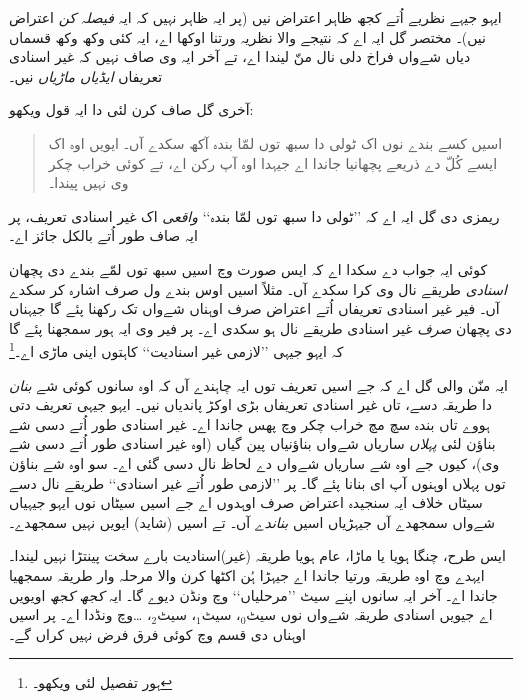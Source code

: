 \documentclass[../../../include/open-logic-section]{subfiles}
\begin{document}
ایہو جیہے نظریے اُتے کجھ ظاہر اعتراض نیں (پر ایہ ظاہر نہیں کہ ایہ
\emph{فیصلہ کن} اعتراض نیں)۔ مختصر گل ایہ اے کہ نتیجے والا نظریہ ورتنا
اوکھا اے، ایہ کئی وکھ وکھ قسماں دیاں شےواں فراخ دلی نال منّ لیندا اے،
تے آخر ایہ وی صاف نہیں کہ غیر اسنادی تعریفاں \emph{ایڈیاں ماڑیاں} نیں۔

آخری گل صاف کرن لئی \citeauthor{Ramsey1925} دا ایہ قول ویکھو:
\begin{quote}
	اسیں کسے بندے نوں اک ٹولی دا سبھ توں لمّا بندہ آکھ سکدے آں۔ ایویں
	اوہ اک ایسے کُلّ دے ذریعے پچھانیا جاندا اے جیہدا اوہ آپ رکن اے،
	تے کوئی خراب چکر وی نہیں پیندا۔ \citep{Ramsey1925}
\end{quote}
ریمزی دی گل ایہ اے کہ ’’ٹولی دا سبھ توں لمّا بندہ‘‘ \emph{واقعی} اک غیر اسنادی
تعریف، پر ایہ صاف طور اُتے بالکل جائز اے۔

کوئی ایہ جواب دے سکدا اے کہ ایس صورت وچ اسیں سبھ توں لمّے بندے دی پچھان
\emph{اسنادی} طریقے نال وی کرا سکدے آں۔ مثلاً اسیں اوس بندے ول صرف اشارہ
کر سکدے آں۔ فیر غیر اسنادی تعریفاں اُتے اعتراض صرف اوہناں شےواں تک
رکھنا پئے گا جیہناں دی پچھان \emph{صرف} غیر اسنادی طریقے نال ہو سکدی اے۔
پر فیر وی ایہ ہور سمجھنا پئے گا کہ ایہو جیہی ’’لازمی غیر اسنادیت‘‘
کاہتوں اینی ماڑی اے۔\footnote{ہور تفصیل لئی \citet{Linnebo2010} ویکھو۔}

ایہ منّن والی گل اے کہ جے اسیں تعریف توں ایہ چاہندے آں کہ اوہ سانوں
کوئی شے \emph{بنان} دا طریقہ دسے، تاں غیر اسنادی تعریفاں بڑی اوکڑ پاندیاں
نیں۔ ایہو جیہی تعریف دتی ہووے تاں بندہ سچ مچ خراب چکر وچ پھس جاندا اے۔
غیر اسنادی طور اُتے دسی شے بناؤن لئی \emph{پہلاں} ساریاں شےواں بناؤنیاں
پین گیاں (اوہ غیر اسنادی طور اُتے دسی شے وی)، کیوں جے اوہ شے ساریاں شےواں
دے لحاظ نال دسی گئی اے۔ سو اوہ شے بناؤن توں پہلاں اوہنوں آپ ای بنانا پئے گا۔
پر ’’لازمی طور اُتے غیر اسنادی‘‘ طریقے نال دسے سیٹاں خلاف ایہ سنجیدہ اعتراض
صرف اوہدوں اے جے اسیں سیٹاں نوں ایہو جیہیاں شےواں سمجھدے آں جیہڑیاں
اسیں \emph{بناندے} آں۔ تے اسیں (شاید) ایویں نہیں سمجھدے۔

ایس طرح، چنگا ہویا یا ماڑا، عام ہویا طریقہ (غیر)اسنادیت بارے سخت پینتڑا
نہیں لیندا۔ ایہدے وچ اوہ طریقہ ورتیا جاندا اے جیہڑا ہُن اکٹھا کرن والا
مرحلہ وار طریقہ سمجھیا جاندا اے۔ آخر ایہ سانوں اپنے سیٹ ’’مرحلیاں‘‘ وچ
ونڈن دیوے گا۔ ایہ \emph{کجھ کجھ} اویویں اے جیویں اسنادی طریقہ شےواں نوں
سیٹ$_0$، سیٹ$_1$، سیٹ$_2$، \ldots وچ ونڈدا اے۔ پر اسیں اوہناں دی قسم وچ
کوئی فرق فرض نہیں کراں گے۔
\end{document}
